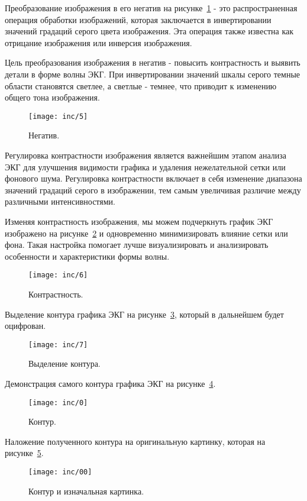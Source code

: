 Преобразование изображения в его негатив на рисунке~\ref{fig:fig5} - это распространенная операция обработки изображений, которая заключается в инвертировании значений градаций серого цвета изображения. Эта операция также известна как отрицание изображения или инверсия изображения.

Цель преобразования изображения в негатив - повысить контрастность и выявить детали в форме волны ЭКГ. При инвертировании значений шкалы серого темные области становятся светлее, а светлые - темнее, что приводит к изменению общего тона изображения.

\begin{figure}
  \texttt{[image: inc/5]}
  \caption{Негатив.}
  \label{fig:fig5}
\end{figure}

Регулировка контрастности изображения является важнейшим этапом анализа ЭКГ для улучшения видимости графика и удаления нежелательной сетки или фонового шума. Регулировка контрастности включает в себя изменение диапазона значений градаций серого в изображении, тем самым увеличивая различие между различными интенсивностями.

Изменяя контрастность изображения, мы можем подчеркнуть график ЭКГ изображено на рисунке~\ref{fig:fig6} и одновременно минимизировать влияние сетки или фона. Такая настройка помогает лучше визуализировать и анализировать особенности и характеристики формы волны.

\begin{figure}
  \texttt{[image: inc/6]}
  \caption{Контрастность.}
  \label{fig:fig6}
\end{figure}

Выделение контура графика ЭКГ на рисунке~\ref{fig:fig7}, который в дальнейшем будет оцифрован.

\begin{figure}
  \texttt{[image: inc/7]}
  \caption{Выделение контура.}
  \label{fig:fig7}
\end{figure}

Демонстрация самого контура графика ЭКГ на рисунке~\ref{fig:fig8}.

\begin{figure}
  \texttt{[image: inc/0]}
  \caption{Контур.}
  \label{fig:fig8}
\end{figure}

Наложение полученного контура на оригинальную картинку, которая на рисунке~\ref{fig:fig9}. 

\begin{figure}
  \texttt{[image: inc/00]}
  \caption{Контур и изначальная картинка.}
  \label{fig:fig9}
\end{figure}

